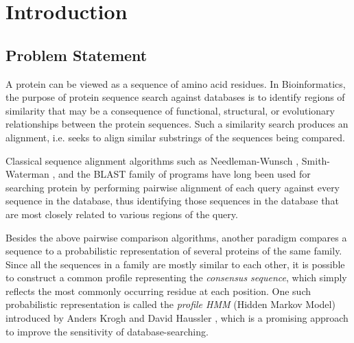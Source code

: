 
\chapter{Introduction} %



\section{Problem Statement}

A protein can be viewed as a sequence of amino acid residues. In Bioinformatics, the purpose of protein sequence search against databases is to identify regions of similarity that may be a consequence of functional, structural, or evolutionary relationships between the protein sequences.
Such a similarity search produces an alignment, i.e. seeks to align similar substrings of the sequences being compared.

Classical sequence alignment algorithms such as Needleman-Wunsch \citep{Needleman}, Smith-Waterman \citep{SW}, and the BLAST family of programs \citep{Altschul} have long been used for searching protein by performing pairwise alignment of each query against every sequence in the database, thus identifying those sequences in the database that are most closely related to various regions of the query.

Besides the above pairwise comparison algorithms, another paradigm compares a sequence to a probabilistic representation of several
proteins of the same family. Since all the sequences in a family are mostly similar to each other, it is possible to construct a common profile representing the \emph{consensus sequence}, which simply reflects the most commonly occurring residue at each position. One such probabilistic representation is called the \emph{profile HMM} (Hidden Markov Model) introduced by Anders Krogh and David Haussler \citep{Krogh}, which is a promising approach to improve the sensitivity of database-searching.

